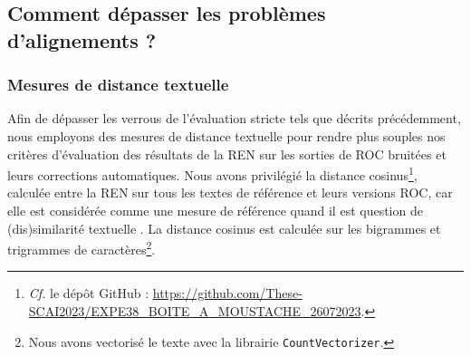 \subsection{Comment dépasser les problèmes d'alignements ? }
\label{subsec:ditances_creux_COR-OCR-IMPACT-NER}
\subsubsection{Mesures de distance textuelle}

Afin de dépasser les verrous de l'évaluation stricte tels que décrits précédemment, nous employons des mesures de distance textuelle pour rendre plus souples nos critères d'évaluation des résultats de la REN sur les sorties de ROC bruitées et leurs corrections automatiques. Nous avons privilégié la distance
cosinus\footnote{\textit{Cf.} le dépôt GitHub : \url{https://github.com/These-SCAI2023/EXPE38_BOITE_A_MOUSTACHE_26072023}.}, calculée entre la REN sur tous les textes de référence et leurs versions ROC, car elle est considérée comme une mesure de référence quand il est question de (dis)similarité textuelle \cite{buscaldi2020calcul}. La distance cosinus est calculée sur les bigrammes et trigrammes de caractères\footnote{Nous avons vectorisé le texte avec la librairie \texttt{CountVectorizer}.}. 
